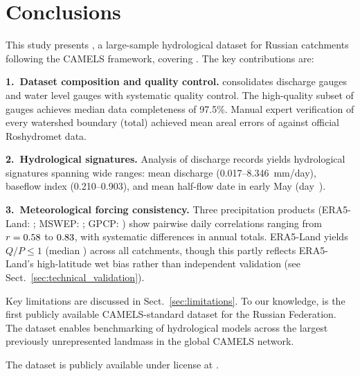 \section{Conclusions}
\label{sec:conclusions}

This study presents \dataset, a large-sample hydrological dataset for \ntotal Russian catchments following the CAMELS framework, covering \years.
The key contributions are:

\textbf{1.~Dataset composition and quality control.}
\dataset consolidates \ndischarge discharge gauges and \nwaterlevel water level gauges with systematic quality control.
The high-quality subset of \nhighquality gauges achieves median data completeness of 97.5\%.
Manual expert verification of every watershed boundary (\ntotal total) achieved mean areal errors of \meanerror against official Roshydromet data.

\textbf{2.~Hydrological signatures.}
Analysis of \nsigngauges discharge records yields \nsignatures hydrological signatures spanning wide ranges: mean discharge \meandischarge (0.017--8.346~mm/day), baseflow index \meanbaseflowindex (0.210--0.903), and mean half-flow date in early May (day~\meanhalfflowday).

\textbf{3.~Meteorological forcing consistency.}
Three precipitation products (ERA5-Land: \erafiveannual; MSWEP: \mswepannual; GPCP: \gpcpannual) show pairwise daily correlations ranging from $r = 0.58$ to $0.83$, with systematic differences in annual totals.
ERA5-Land yields $Q/P \leq 1$ (median \medianrunoffratio) across all catchments, though this partly reflects ERA5-Land's high-latitude wet bias rather than independent validation (see Sect.~\ref{sec:technical_validation}).

Key limitations are discussed in Sect.~\ref{sec:limitations}.
To our knowledge, \dataset is the first publicly available CAMELS-standard dataset for the Russian Federation.
The dataset enables benchmarking of hydrological models across the largest previously unrepresented landmass in the global CAMELS network.

The dataset is publicly available under \license license at .
